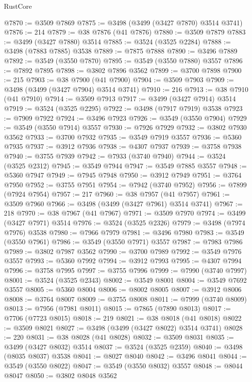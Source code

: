 \begin{lexlean}{RustCore}
\begin{coremodule}
@7870 := @3509 @7869
@7875 := @3498 (@3499 (@3427 @7870) @3514 @3741)
@7876 := 214
@7879 := @38 @7876 (@41 @7876)
@7880 := @3509 @7879
@7883 := @3499 (@3427 @7880) @3514
@7885 := @3524 (@3525 @2284)
@7888 := @3498 (@7883 @7885) @3538
@7889 := @7875 @7888
@7890 := @3496 @7889
@7892 := @3549 (@3550 @7870)
@7895 := @3549 (@3550 @7880) @3557
@7896 := @7892 @7895
@7898 := @3802 @7896 @3562
@7899 := @3700 @7898
@7900 := 215
@7903 := @38 @7900 (@41 @7900)
@7904 := @3509 @7903
@7909 := @3498 (@3499 (@3427 @7904) @3514 @3741)
@7910 := 216
@7913 := @38 @7910 (@41 @7910)
@7914 := @3509 @7913
@7917 := @3499 (@3427 @7914) @3514
@7919 := @3524 (@3525 @2295)
@7922 := @3498 (@7917 @7919) @3538
@7923 := @7909 @7922
@7924 := @3496 @7923
@7926 := @3549 (@3550 @7904)
@7929 := @3549 (@3550 @7914) @3557
@7930 := @7926 @7929
@7932 := @3802 @7930 @3562
@7933 := @3700 @7932
@7935 := @3549 @7919 @3557
@7936 := @5360 @7935
@7937 := @3912 @7936
@7938 := @4307 @7937
@7939 := @3758 @7938
@7940 := @3755 @7939
@7942 := @7933 (@3740 @7940)
@7944 := @3524 (@3525 @2312)
@7945 := @3549 @7944
@7947 := @3549 @7885 @3557
@7948 := @5360 @7947
@7949 := @7945 @7948
@7950 := @3912 @7949
@7951 := @3764 @7950
@7952 := @3755 @7951
@7954 := @7942 (@3740 @7952)
@7956 := @7899 (@7924 @7954)
@7957 := 217
@7960 := @38 @7957 (@41 @7957)
@7961 := @3509 @7960
@7966 := @3498 (@3499 (@3427 @7961) @3514 @3741)
@7967 := 218
@7970 := @38 @7967 (@41 @7967)
@7971 := @3509 @7970
@7974 := @3499 (@3427 @7971) @3514
@7976 := @3524 (@3525 @2326)
@7979 := @3498 (@7974 @7976) @3538
@7980 := @7966 @7979
@7981 := @3496 @7980
@7983 := @3549 (@3550 @7961)
@7986 := @3549 (@3550 @7971) @3557
@7987 := @7983 @7986
@7989 := @3802 @7987 @3562
@7990 := @3700 @7989
@7992 := @3549 @7976 @3557
@7993 := @5360 @7992
@7994 := @3912 @7993
@7995 := @4307 @7994
@7996 := @3758 @7995
@7997 := @3755 @7996
@7999 := @7990 (@3740 @7997)
@8001 := @3524 (@3525 @2343)
@8002 := @3549 @8001
@8004 := @3549 @7692 @3557
@8005 := @5360 @8004
@8006 := @8002 @8005
@8007 := @3912 @8006
@8008 := @3764 @8007
@8009 := @3755 @8008
@8011 := @7999 (@3740 @8009)
@8013 := @7956 (@7981 @8011)
@8015 := @7865 (@7890 @8013)
@8017 := @7706 (@7723 @8015)
@8018 := 219
@8021 := @38 @8018 (@41 @8018)
@8022 := @3509 @8021
@8027 := @3498 (@3499 (@3427 @8022) @3514 @3741)
@8028 := 220
@8031 := @38 @8028 (@41 @8028)
@8032 := @3509 @8031
@8035 := @3499 (@3427 @8032) @3514
@8037 := @3524 (@3525 @2359)
@8040 := @3498 (@8035 @8037) @3538
@8041 := @8027 @8040
@8042 := @3496 @8041
@8044 := @3549 (@3550 @8022)
@8047 := @3549 (@3550 @8032) @3557
@8048 := @8044 @8047
@8050 := @3802 @8048 @3562

\end{coremodule}
\end{lexlean}
